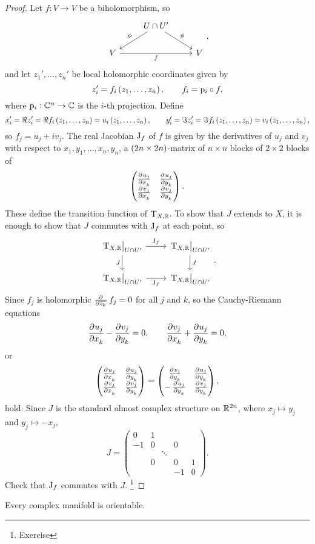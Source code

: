 \begin{proof}
Let $ f : V \to V $ be a biholomorphism, so
$$
\begin{tikzcd}
& U \cap U' \arrow[swap]{dl}{\phi} \arrow{dr}{\phi} & \\
V \arrow[swap]{rr}{f} & & V
\end{tikzcd},
$$
and let $ z_1', \dots, z_n' $ be local holomorphic coordinates given by
$$ z_i' = f_i\br{z_1, \dots, z_n}, \qquad f_i = \p_i \circ f, $$
where $ \mathrm{p}_i : \mathbb{C}^n \to \mathbb{C} $ is the $ i $-th projection. Define
$$ x_i' = \Re z_i' = \Re f_i\br{z_1, \dots, z_n} = u_i\br{z_1, \dots, z_n}, \qquad y_i' = \Im z_i' = \Im f_i\br{z_1, \dots, z_n} = v_i\br{z_1, \dots, z_n}, $$
so $ f_j = u_j + iv_j $. The real Jacobian $ \mathrm{J}_f $ of $ f $ is given by the derivatives of $ u_j $ and $ v_j $ with respect to $ x_1, y_1, \dots, x_n, y_n $, a $ \br{2n \times 2n} $-matrix of $ n \times n $ blocks of $ 2 \times 2 $ blocks of
$$ \twobytwo{\tpd{u_j}{x_k}}{\tpd{u_j}{y_k}}{\tpd{v_j}{x_k}}{\tpd{v_j}{y_k}}. $$
These define the transition function of $ \mathrm{T}_{X, \mathbb{R}} $. To show that $ J $ extends to $ X $, it is enough to show that $ J $ commutes with $ \mathrm{J}_f $ at each point, so
$$
\begin{tikzcd}
\eval{\T_{X, \RR}}_{U \cap U'} \arrow{r}{\J_f} \arrow[swap]{d}{J} & \eval{\T_{X, \RR}}_{U \cap U'} \arrow{d}{J} \\
\eval{\T_{X, \RR}}_{U \cap U'} \arrow[swap]{r}{\J_f} & \eval{\T_{X, \RR}}_{U \cap U'}
\end{tikzcd}.
$$
Since $ f_j $ is holomorphic $ \tpd{}{\overline{z_k}}f_j = 0 $ for all $ j $ and $ k $, so the Cauchy-Riemann equations
$$ \dpd{u_j}{x_k} - \dpd{v_j}{y_k} = 0, \qquad \dpd{v_j}{x_k} + \dpd{u_j}{y_k} = 0, $$
or
$$ \twobytwo{\tpd{u_j}{x_k}}{\tpd{u_j}{y_k}}{\tpd{v_j}{x_k}}{\tpd{v_j}{y_k}} = \twobytwo{\tpd{v_j}{y_k}}{\tpd{u_j}{y_k}}{-\tpd{u_j}{y_k}}{\tpd{v_j}{y_k}}, $$
hold. Since $ J $ is the standard almost complex structure on $ \mathbb{R}^{2n} $, where $ x_j \mapsto y_j $ and $ y_j \mapsto -x_j $,
$$ J =
\begin{pmatrix}
0 & 1 & & & \\
-1 & 0 & & 0 & \\
& & \ddots & & \\
& 0 & & 0 & 1 \\
& & & -1 & 0
\end{pmatrix}.
$$
Check that $ \mathrm{J}_f $ commutes with $ J $. \footnote{Exercise}
\end{proof}

\begin{corollary}
Every complex manifold is orientable.
\end{corollary}

